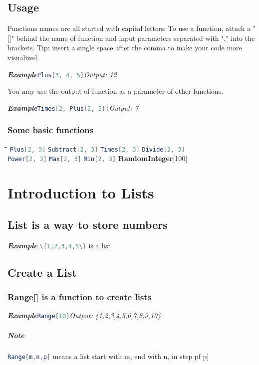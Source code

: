 \documentclass[10pt]{book}
\newcommand{\iocode}[2]{\lstinline[language=Mathematica]|#1|\hspace{\fill}\emph{Output: #2}}
\newcommand{\incode}[1]{\lstinline[language=Mathematica]|#1|}
\newcommand{\egio}[2]{\noindent\emph{\textbf{Example}}\quad\iocode{#1}{#2}}
\begin{document}
\section{Usage}
Functions names are all started with capital letters. To use a function, attach a "[]" behind the name of function and input parameters separated with "," into the brackets. Tip: insert a single space after the comma to make your code more visualized.

\egio{Plus[3, 4, 5]}{12}

\noindent You may use the output of function as a parameter of other functions.

\egio{Times[2, Plus[2, 3]]}{7}
\subsection{Some basic functions}
\begin{tabbing}
\hspace{0.25\linewidth}\=\hspace{0.25\linewidth}\=\hspace{0.25\linewidth}\=\kill
\incode{Plus[2, 3]} \> \incode{Subtract[2, 3]} \> \incode{Times[2, 3]} \> \incode{Divide[2, 3]} \\ 
\incode{Power[2, 3]} \> \incode{Max[2, 3]} \> \incode{Min[2, 3]} \> \textbf{RandomInteger}[100] \\ 
\end{tabbing} 
\chapter{Introduction to Lists}
\section{List is a way to store numbers}
\emph{\textbf{Example}}\quad
\incode{\{1,2,3,4,5\}} is a list
\section{Create a List}
\subsection{Range[] is a function to create lists}
\egio{Range[10]}{\{1,2,3,4,5,6,7,8,9,10\}}

\paragraph{Note}\incode{Range[m,n,p]} means a list start with m, end with n, in step pf p]
\end{document}

